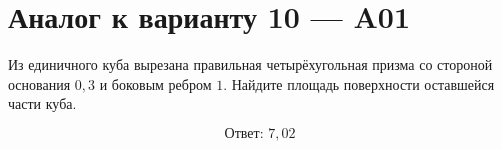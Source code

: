 \documentclass[12pt,a4paper]{article}
\begin{document}
\section*{Аналог к варианту 10 — A01}

Из единичного куба вырезана правильная четырёхугольная призма со стороной основания \(0{,}3\) и боковым ребром \(1\). Найдите площадь поверхности оставшейся части куба.

\begin{center}
\end{center}

\[
\boxed{\text{Ответ: }7{,}02}
\]
\end{document}
